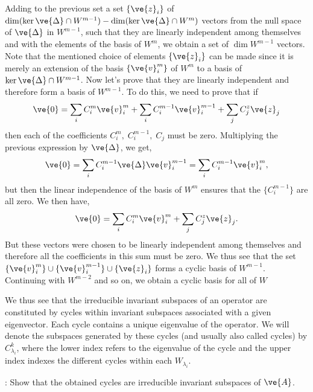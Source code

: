 Adding to the previous set a set $\{\ve{z}_i\}$ of 
{\small $\dim (\ker \ve{\Delta} \cap W^{m-1}) - \dim (\ker \ve{\Delta} \cap W^m)$} 
vectors from the null space of $\ve{\Delta}$ in $W^{m-1}$, such that they are linearly independent 
among themselves and with the elements of the basis of $W^m$, we obtain a set of 
$\dim W^{m-1}$ vectors.
Note that the mentioned choice of elements $\{\ve{z}_i\}$ can be made since
it is merely an extension of the basis $\{\ve{v}^m_i\}$ of $W^m$ to a basis of 
$\ker \ve{\Delta} \cap W^{m-1}$.
Now let's prove that they are linearly independent and therefore form a basis
of $W^{m-1}$. To do this, we need to prove that if
\begin{equation}
  \ve{0} = \sum_i C^m_i \ve{v}^m_i + \sum_i C^{m-1}_i \ve{v}^{m-1}_i + \sum_j C^z_j \ve{z}_j
\end{equation}
then each of the coefficients $C^m_i,\; C^{m-1}_i,\; C_j$ must be zero.
Multiplying the previous expression by $\ve{\Delta}$, we get,
\begin{equation}
  \ve{0} =  \sum_i C^{m-1}_i \ve{\Delta}\ve{v}^{m-1}_i = \sum_i C^{m-1}_i \ve{v}^{m}_i,
\end{equation}
but then the linear independence of the basis of $W^m$ ensures that the 
$\{C^{m-1}_i\}$ are all zero. We then have,
\begin{equation}
  \ve{0} = \sum_i C^m_i \ve{v}^m_i + \sum_j C^z_j \ve{z}_j.
\end{equation}
But these vectors were chosen to be linearly independent among themselves and therefore
all the coefficients in this sum must be zero. We thus see that the
set $\{\ve{v}^m_i\} \cup \{\ve{v}^{m-1}_i\} \cup \{\ve{z}_i\}$ forms a
cyclic basis of $W^{m-1}$. Continuing with $W^{m-2}$ and so on,
we obtain a cyclic basis for all of $W$
\epru

We thus see that the irreducible invariant subspaces of an operator are
constituted by cycles within invariant subspaces associated with a given
eigenvector. Each cycle contains a unique eigenvalue of the operator. 
We will denote the subspaces generated by these cycles (and usually also called
cycles) by $C^{k}_{\lambda_i}$, where the lower index refers to the eigenvalue of the
cycle and the upper index indexes the different cycles within each $W_{\lambda_i}$.

\ejer: Show that the obtained cycles are irreducible invariant subspaces of $\ve{A}$.


